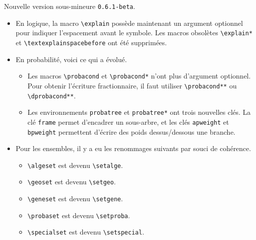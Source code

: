Nouvelle version sous-mineure \verb+0.6.1-beta+.

\begin{itemize}[itemsep=.5em]
    \item En logique, la macro \verb+\explain+ possède maintenant un argument optionnel pour indiquer l'espacement avant le symbole. Les macros obsolètes \verb+\explain*+ et \verb+\textexplainspacebefore+ ont été supprimées.


    \item En probabilité, voici ce qui a évolué.
    \begin{itemize}[itemsep=.5em]
        \item Les macros \verb+\probacond+ et \verb+\probacond*+ n'ont plus d'argument optionnel. Pour obtenir l'écriture fractionnaire, il faut utiliser \verb+\probacond**+ ou \verb+\dprobacond**+.

        \item Les environnements \verb+probatree+ et \verb+probatree*+ ont trois nouvelles clés.
                  La clé \verb+frame+ permet d'encadrer un sous-arbre, et les clés \verb+apweight+ et \verb+bpweight+ permettent d'écrire des poids dessus/dessous une branche.
    \end{itemize}


    \item Pour les ensembles, il y a eu les renommages suivants par souci de cohérence.
    \begin{itemize}[itemsep=.5em]
        \item \verb+\algeset+ est devenu \verb+\setalge+.

        \item \verb+\geoset+ est devenu \verb+\setgeo+.

        \item \verb+\geneset+ est devenu \verb+\setgene+.

        \item \verb+\probaset+ est devenu \verb+\setproba+.

        \item \verb+\specialset+ est devenu \verb+\setspecial+.
    \end{itemize}
\end{itemize}
